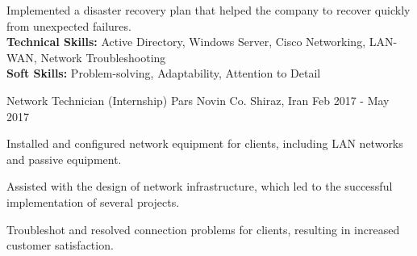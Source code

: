 \begin{cventries}
{\begin{cvitems}
        \item {Implemented a disaster recovery plan that helped the company to recover quickly from unexpected failures.
        \\\textbf{Technical Skills:} Active Directory, Windows Server, Cisco Networking, LAN-WAN, Network Troubleshooting
        \\\textbf{Soft Skills:} Problem-solving, Adaptability, Attention to Detail}%
      \end{cvitems}%
    }%
  \cventry
    {Network Technician (Internship)} %
    {Pars Novin Co.} %
    {Shiraz, Iran} %
    {Feb 2017 - May 2017} %
    {
      \begin{cvitems} %
        \item {Installed and configured network equipment for clients, including LAN networks and passive equipment.}
        \item {Assisted with the design of network infrastructure, which led to the successful implementation of several projects.}
        \item {Troubleshot and resolved connection problems for clients, resulting in increased customer satisfaction.}%
      \end{cvitems}
    }
\end{cventries}
